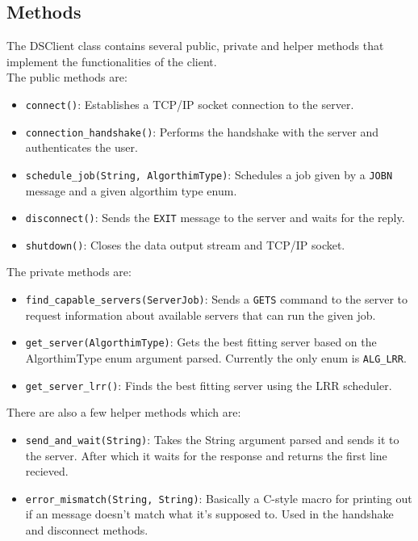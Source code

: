 \documentclass[a4paper]{article} %
\begin{document}
\subsection{Methods}
The DSClient class contains several public, private and helper methods that implement the functionalities of the client. \\
The public methods are:
\begin{itemize}
	\item  \texttt{connect()}: Establishes a TCP/IP socket connection to the server.
	\item \texttt{connection\_handshake()}: Performs the handshake with the server and authenticates the user.
	\item \texttt{schedule\_job(String, AlgorthimType)}: Schedules a job given by a \texttt{JOBN} message and a given algorthim type enum.
	\item \texttt{disconnect()}: Sends the \texttt{EXIT} message to the server and waits for the reply.
	\item \texttt{shutdown()}: Closes the data output stream and TCP/IP socket.
\end{itemize}

The private methods are:
\begin{itemize}
	\item \texttt{find\_capable\_servers(ServerJob)}: Sends a \texttt{GETS} command to the server to request information about available servers that can run the given job.
	\item  \texttt{get\_server(AlgorthimType)}: Gets the best fitting server based on the AlgorthimType enum argument parsed. Currently the only enum is \texttt{ALG\_LRR}.
	\item  \texttt{get\_server\_lrr()}: Finds the best fitting server using the LRR scheduler. 
\end{itemize}

There are also a few helper methods which are:
\begin{itemize}
	\item  \texttt{send\_and\_wait(String)}: Takes the String argument parsed and sends it to the server. After which it waits for the response and returns the first line recieved.
	\item  \texttt{error\_mismatch(String, String)}: Basically a C-style macro for printing out if an message doesn't match what it's supposed to. Used in the handshake and disconnect methods.
\end{itemize}



\end{document}
